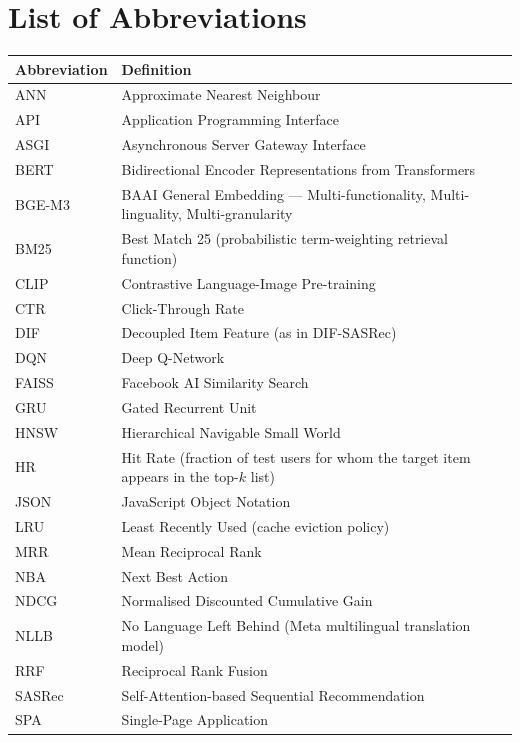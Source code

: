 \chapter*{List of Abbreviations}

\begin{longtable}{|p{3cm}|p{10cm}|}
\hline
\textbf{Abbreviation} & \textbf{Definition} \\
\hline
\endhead

ANN     & Approximate Nearest Neighbour \\
\hline
API     & Application Programming Interface \\
\hline
ASGI    & Asynchronous Server Gateway Interface \\
\hline
BERT    & Bidirectional Encoder Representations from Transformers \\
\hline
BGE-M3  & BAAI General Embedding — Multi-functionality, Multi-linguality, Multi-granularity \\
\hline
BM25    & Best Match 25 (probabilistic term-weighting retrieval function) \\
\hline
CLIP    & Contrastive Language-Image Pre-training \\
\hline
CTR     & Click-Through Rate \\
\hline
DIF     & Decoupled Item Feature (as in DIF-SASRec) \\
\hline
DQN     & Deep Q-Network \\
\hline
FAISS   & Facebook AI Similarity Search \\
\hline
GRU     & Gated Recurrent Unit \\
\hline
HNSW    & Hierarchical Navigable Small World \\
\hline
HR      & Hit Rate (fraction of test users for whom the target item appears in the top-$k$ list) \\
\hline
JSON    & JavaScript Object Notation \\
\hline
LRU     & Least Recently Used (cache eviction policy) \\
\hline
MRR     & Mean Reciprocal Rank \\
\hline
NBA     & Next Best Action \\
\hline
NDCG    & Normalised Discounted Cumulative Gain \\
\hline
NLLB    & No Language Left Behind (Meta multilingual translation model) \\
\hline
RRF     & Reciprocal Rank Fusion \\
\hline
SASRec  & Self-Attention-based Sequential Recommendation \\
\hline
SPA     & Single-Page Application \\
\hline

\end{longtable}
